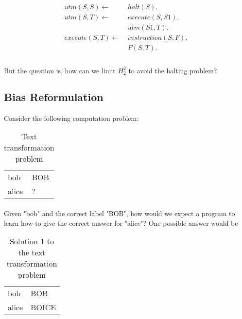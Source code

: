 \documentclass{article}
\theoremstyle{plain}
\theoremstyle{definition}
\begin{document}
\begin{multicols}{2}
\begin{align*}
utm(S, S) \leftarrow\ &halt(S).\\
utm(S, T) \leftarrow\ &execute(S, S1),\\ &utm(S1, T).\\
execute(S, T) \leftarrow\ &instruction(S, F),\\ &F(S, T).\\
\end{align*}

\paragraph{} But the question is, how can we limit $H^2_2$ to avoid the halting problem?

\subsection{Bias Reformulation}

\paragraph{} Consider the following computation problem:

\begin{table}[H]
\centering\footnotesize
\begin{tabular}{ | l | l | }
\hline
bob & BOB \\
alice & ?\\
\hline
\end{tabular}
\caption{Text transformation problem}\label{table:MILTextTransformation}
\end{table}

\paragraph{} Given "bob" and the correct label "BOB", how would we expect a program to learn how to give the correct answer for "alice"? One possible answer would be

\begin{table}[H]
\centering\footnotesize
\begin{tabular}{ | l | l | }
\hline
bob & BOB \\
alice & BOICE\\
\hline
\end{tabular}
\caption{Solution 1 to the text transformation problem}\label{table:MILTextTransformation2}
\end{table}


\end{multicols}
\end{document}
